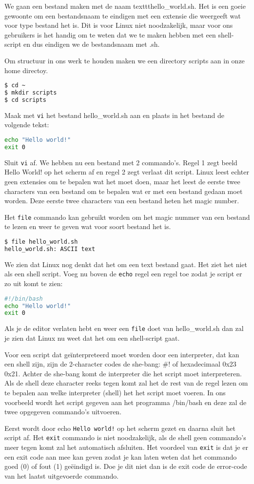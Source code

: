 We gaan een bestand maken met de naam texttt{hello\_world.sh}. Het is een goeie gewoonte om een bestandsnaam te eindigen met een extensie die weergeeft wat voor type bestand het is. Dit is voor Linux niet noodzakelijk, maar voor ons gebruikers is het handig om te weten dat we te maken hebben met een shell-script en dus eindigen we de bestandsnaam met .sh.

Om structuur in ons werk te houden maken we een directory scripts aan in onze home directoy.
\begin{lstlisting}[language=bash]
$ cd ~
$ mkdir scripts
$ cd scripts
\end{lstlisting}
Maak met \texttt{vi} het bestand hello\_world.sh aan en plaats in het bestand de volgende tekst:
\begin{lstlisting}[language=bash]
echo "Hello world!"
exit 0
\end{lstlisting}
Sluit \texttt{vi} af. We hebben nu een bestand met 2 commando's. Regel 1 zegt beeld Hello World! op het scherm af en regel 2 zegt verlaat dit script. Linux leest echter geen extensies om te bepalen wat het moet doen, maar het leest de eerste twee characters van een bestand om te bepalen wat er met een bestand gedaan moet worden. Deze eerste twee characters van een bestand heten het magic number.

Het \texttt{file} commando kan gebruikt worden om het magic nummer van een bestand te lezen en weer te geven wat voor soort bestand het is.
\begin{lstlisting}[language=bash]
$ file hello_world.sh
hello_world.sh: ASCII text
\end{lstlisting}
We zien dat Linux nog denkt dat het om een text bestand gaat. Het ziet het niet als een shell script. Voeg nu boven de \texttt{echo} regel een regel toe zodat je script er zo uit komt te zien:
\begin{lstlisting}[language=bash]
#!/bin/bash
echo "Hello world!"
exit 0
\end{lstlisting}
Als je de editor verlaten hebt en weer een \texttt{file} doet van hello\_world.sh dan zal je zien dat Linux nu weet dat het om een shell-script gaat.

Voor een script dat ge\"interpreteerd moet worden door een interpreter, dat kan een shell zijn, zijn de 2-character codes de she-bang: \#! of hexadecimaal 0x23 0x21. Achter de she-bang komt de interpreter die het script moet interpreteren. Als de shell deze character reeks tegen komt zal het de rest van de regel lezen om te bepalen aan welke interpreter (shell) het het script moet voeren. In ons voorbeeld wordt het script gegeven aan het programma /bin/bash en deze zal de twee opgegeven commando's uitvoeren.

Eerst wordt door echo \texttt{Hello world!} op het scherm gezet en daarna sluit het script af. Het \texttt{exit} commando is niet noodzakelijk, als de shell geen commando's meer tegen komt zal het automatisch afsluiten. Het voordeel van \texttt{exit} is dat je er een exit code aan mee kan geven zodat je kan laten weten dat het commando goed (0) of fout (1) ge\"eindigd is. Doe je dit niet dan is de exit code de error-code van het laatst uitgevoerde commando.
